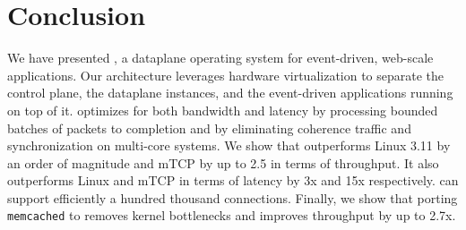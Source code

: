 
\section{Conclusion}

We have presented \ix, a dataplane operating system for event-driven,
web-scale applications.  Our architecture leverages hardware
virtualization to separate the control plane, the \ix dataplane
instances, and the event-driven applications running on top of it.
\ix optimizes for both bandwidth and latency by processing bounded
batches of packets to completion and by eliminating coherence traffic
and synchronization on multi-core systems. We show that \ix
outperforms Linux 3.11 by an order of magnitude and mTCP by up to 2.5
in terms of throughput. It also outperforms Linux and mTCP in terms of
latency by 3x and 15x respectively. \ix can support efficiently a
hundred thousand connections. Finally, we show that porting
\texttt{memcached} to \ix removes kernel bottlenecks and improves
throughput by up to 2.7x.




